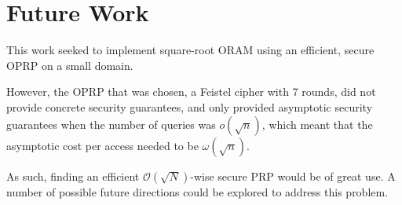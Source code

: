 \section{Future Work}

This work seeked to implement square-root ORAM using an 
efficient, secure OPRP on a small domain.

However, the OPRP that was chosen, a Feistel cipher with 7 rounds,
did not provide concrete security guarantees,
and only provided asymptotic security guarantees when the number
of queries was  $o(\sqrt{n})$, which meant that
the asymptotic cost per access needed to be $\omega(\sqrt{n})$.

As such, finding an efficient $\mathcal{O}(\sqrt{N})$-wise secure PRP
would be of great use.
A number of possible future directions could be explored to address this problem.

